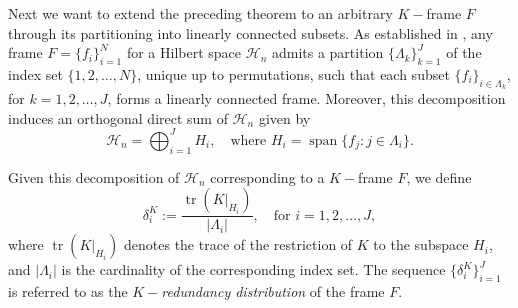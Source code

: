 \documentclass[final,1p,times]{elsarticle}
\begin{document}
Next we want to extend the preceding theorem to an arbitrary $K-$frame \( F \) through its partitioning into linearly connected subsets. As established in \cite{sali}, any frame \( F = \{f_i\}_{i=1}^N \) for a Hilbert space \( \mathcal{H}_n \) admits a partition \( \{\Lambda_k\}_{k=1}^J \) of the index set \( \{1,2,\ldots,N\} \), unique up to permutations, such that each subset \( \{f_i\}_{i \in \Lambda_k} \), for \( k = 1,2,\ldots,J \), forms a linearly connected frame. Moreover, this decomposition induces an orthogonal direct sum of \( \mathcal{H}_n \) given by
\[
\mathcal{H}_n = \bigoplus_{i=1}^J H_i, \quad \text{where } H_i = \operatorname{span} \{f_j : j \in \Lambda_i\}.
\]

Given this decomposition of \( \mathcal{H}_n \) corresponding to a $K-$frame \( F \), we define
\[
\delta_{i}^K := \frac{\operatorname{tr}(K|_{H_i})}{|\Lambda_i|}, \quad \text{for } i = 1,2,\ldots,J,
\]
where \( \operatorname{tr}(K|_{H_i}) \) denotes the trace of the restriction of \( K \) to the subspace \( H_i \), and \( |\Lambda_i| \) is the cardinality of the corresponding index set. The sequence \( \{\delta_{i}^K\}_{i=1}^J \) is referred to as the \textit{$K-$redundancy distribution} of the frame \( F \).
\end{document}
